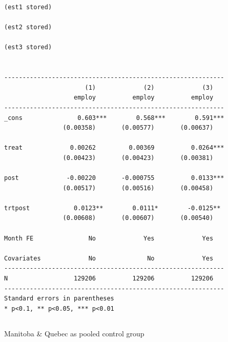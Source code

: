 \documentclass[
  letterpaper,
  DIV=11,
  numbers=noendperiod]{scrartcl}
\begin{document}
\begin{verbatim}
(est1 stored)

(est2 stored)

(est3 stored)


------------------------------------------------------------
                      (1)             (2)             (3)   
                   employ          employ          employ   
------------------------------------------------------------
_cons               0.603***        0.568***        0.591***
                (0.00358)       (0.00577)       (0.00637)   

treat             0.00262         0.00369          0.0264***
                (0.00423)       (0.00423)       (0.00381)   

post             -0.00220       -0.000755          0.0133***
                (0.00517)       (0.00516)       (0.00458)   

trtpost            0.0123**        0.0111*        -0.0125** 
                (0.00608)       (0.00607)       (0.00540)   

Month FE               No             Yes             Yes   

Covariates             No              No             Yes   
------------------------------------------------------------
N                  129206          129206          129206   
------------------------------------------------------------
Standard errors in parentheses
* p<0.1, ** p<0.05, *** p<0.01
\end{verbatim}

\subsection{}\label{section-10}

Manitoba \& Quebec as pooled control group
\end{document}
